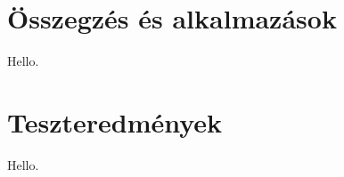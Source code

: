 \documentclass[final]{elteikthesis}[2025/03/25]
\begin{document}
\chapter{Összegzés és alkalmazások}

Hello.

\cleardoublepage

\appendix

\chapter{Teszteredmények}

Hello.

\cleardoublepage

{}
\printbibliography[title=\biblabel]
\cleardoublepage

{}
\listoffigures
\cleardoublepage

{}
\listoftables
\cleardoublepage

{}
\listofalgorithms
\cleardoublepage

{}
\lstlistoflistings
\cleardoublepage
\end{document}
